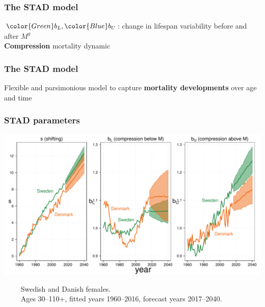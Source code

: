 \documentclass[12pt, xcolor=table]{beamer}  %
\begin{document}
\begin{frame}[noframenumbering]\frametitle{The STAD model}
\begin{center}
\vspace{-0.1cm}
${\color{Green}b_L} , {\color{Blue}b_U}$: change in lifespan variability before and after $M^g$ \\
\textbf{Compression} mortality dynamic \\
\end{center}

\end{frame}

\begin{frame}\frametitle{The STAD model}
\begin{center}
\vspace{-0.1cm}
Flexible and parsimonious model to capture \textbf{mortality developments} over age and time \\
\end{center}

\end{frame}

\begin{frame}\frametitle{STAD parameters}
	
	\vspace{-0.75cm}
	
	\begin{center}	
		\vspace{0.2cm}
		
		\includegraphics[scale=.43]{Figures/Ch2/F3_2_new}
		
	\end{center}
\vspace{-0.2cm}
\tiny{$\quad\quad$ Swedish and Danish females. \\ $\quad\quad$ Ages 30--110+, fitted years 1960--2016, forecast years 2017--2040.}
	
\end{frame}
\end{document}
